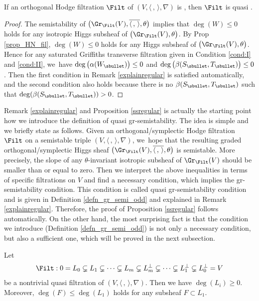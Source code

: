 \begin{prop}\label{ssregular}
If an orthogonal Hodge filtration $\Filt$ of $(V,\langle \,, \, \rangle,\nabla)$ is \grsemistable, then $\Filt$ is quasi \grsemistable.
\end{prop}

\begin{proof}
The semistability of $\big(\Gr_{\Filt}(V), \overline{\langle \,, \, \rangle}, \theta\big)$ implies that $\deg(W)\leq 0$ holds for any isotropic Higgs subsheaf of $\big(\Gr_{\Filt}(V),\theta\big)$. By Prop \ref{prop_HN_fil}, $\deg(W)\leq 0$ holds for any Higgs subsheaf of $\big(\Gr_{\Filt}(V),\theta\big)$. Hence for any saturated Griffiths transverse filtration given in Condition \eqref{cond:I} and \eqref{cond:II}, we~have $\deg\big(\alpha(W_\sbullet)\big)\leq 0$ and $\deg\big(\beta(S_\sbullet,T_\sbullet)\big)\leq0$. Then the first condition in Remark \ref{explainregular} is satisfied automatically, and the second condition also holds because there is no $\beta(S_\sbullet,T_\sbullet)$ such that $\deg( \beta(S_\sbullet,T_\sbullet)) > 0$.
\end{proof}

Remark \ref{explainregular} and Proposition \ref{ssregular} is actually the starting point how we introduce the definition of quasi gr-semistability. The idea is simple and we briefly state as follows. Given an orthogonal/symplectic Hodge filtration $\Filt$ on a semistable triple $(V, \langle \,,\, \rangle, \nabla)$, we~hope that the resulting graded orthogonal/symplectic Higgs sheaf $\big(\Gr_{\Filt}(V), \overline{\langle \,, \, \rangle}, \theta\big)$ is semistable. More precisely, the slope of any $\theta$-invariant isotropic subsheaf of $\Gr_{\Filt}(V)$ should be smaller than or equal to zero. Then we interpret the above inequalities in terms of specific filtrations on $V$ and find a necessary condition, which implies the gr-semistability condition. This condition is called quasi gr-semistability condition and is given in Definition \ref{defn_gr_semi_odd} and explained in Remark \ref{explainregular}. Therefore, the proof of Proposition \ref{ssregular} follows automatically. On the other hand, the most surprising fact is that the condition we introduce (Definition \ref{defn_gr_semi_odd}) is not only a necessary condition, but also a sufficient one, which will be proved in the next subsection.

\begin{prop}\label{positive}
Let
\[
\Filt: 0= L_0 \subsetneq L_1 \subsetneq \cdots \subsetneq L_m \subsetneq L_m^\perp\subsetneq\cdots \subsetneq L_1^\perp\subsetneq L_0^\perp= V
\]
be a nontrivial quasi \grsemistable filtration of $(V, \langle \,, \, \rangle, \nabla)$. Then we have $\deg(L_i)\geq 0$. Moreover, $\deg(F)\leq \deg(L_1)$ holds for any subsheaf $F\subset L_1$.
\end{prop}

